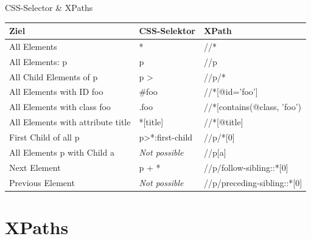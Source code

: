 \documentclass[xcolor=dvipsnames]{beamer}\usepackage[]{graphicx}\usepackage[]{color}
\begin{document}
\begin{frame}{CSS-Selector \& XPaths}
\footnotesize
\begin{table}[]
\footnotesize
\begin{tabular}{lll}
\hline
\textbf{Ziel}                              & \textbf{CSS-Selektor}                 & \textbf{XPath}                           \\ \hline
All Elements                      & *                            & //*                             \\ \hline
All Elements: p                   & p                            & //p                             \\ \hline
All Child Elements of p           & p \textgreater *             & //p/*                           \\ \hline
All Elements with ID foo          & \#foo                        & //*{[}@id='foo'{]}              \\ \hline
All Elements with class foo       & .foo                         & //*{[}contains(@class, 'foo')   \\ \hline
All Elements with attribute title & *{[}title{]}                 & //*{[}@title{]}                 \\ \hline
First Child of all p              & p\textgreater{}*:first-child & //p/*{[}0{]}                    \\ \hline
All Elements p with Child a       & \textit{Not possible}        & //p{[}a{]}                      \\ \hline
Next Element                      & p + *                        & //p/follow-sibling::*{[}0{]}    \\ \cline{1-1} \cline{3-3} 
Previous Element                  & \textit{Not possible}        & //p/preceding-sibling::*{[}0{]} \\ \hline
\end{tabular}
\end{table}
\end{frame}



\section{XPaths}
\end{document}
